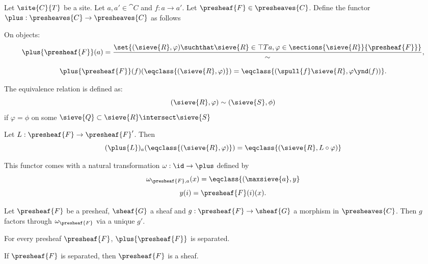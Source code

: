 \begin{definition}
Let $\site{C}{T}$ be a site.
Let $a, a' \in \cat{C}$ and $f:a \rightarrow a'$. 
Let $\presheaf{F} \in \presheaves{C}$.
Define the functor $\plus: \presheaves{C} \rightarrow \presheaves{C}$ as follows

On objects:
\[\plus{\presheaf{F}}(a) = \frac{\set{(\sieve{R},\varphi) 
	\suchthat \sieve{R} \in \top{T}{a},
	\varphi \in \sections{\sieve{R}}{\presheaf{F}}}}
	{\sim},
\]


\[ \plus{\presheaf{F}}(f)(\eqclass{(\sieve{R},\varphi)}) 
	= \eqclass{(\spull{f}\sieve{R}, \varphi\ynd(f) )}.
\]

The equivalence relation is defined as:
\[(\sieve{R},\varphi) \sim (\sieve{S},\phi)\]
if $\varphi = \phi$ on some $\sieve{Q} \subset \sieve{R} \intersect \sieve{S}$

Let $L: \presheaf{F} \rightarrow \presheaf{F}'$.
Then 
\[ (\plus{L})_a (\eqclass{(\sieve{R}, \varphi)})
	= \eqclass{(\sieve{R}, L \circ \varphi)}
\]

This functor comes with a natural transformation $\omega: \id \rightarrow \plus$
defined by
\[\omega_{\presheaf{F},a}(x) = \eqclass{(\maxsieve{a}, y}\]
\[y(i) = \presheaf{F}(i)(x).\]
\end{definition}

\begin{lemma}
Let $\presheaf{F}$ be a presheaf, $\sheaf{G}$ a sheaf and $g:\presheaf{F} \rightarrow \sheaf{G}$ a morphism in $\presheaves{C}$.
Then $g$ factors through $\omega_{\presheaf{F}}$ via a unique $g'$.
\end{lemma}

\begin{lemma}
For every presheaf $\presheaf{F}$, $\plus{\presheaf{F}}$ is separated.
\end{lemma}

\begin{lemma}
If $\presheaf{F}$ is separated, then $\presheaf{F}$ is a sheaf.
\end{lemma}